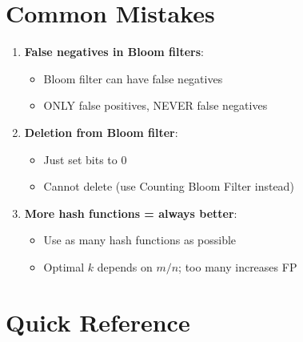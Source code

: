 \section{Common Mistakes}

\begin{warningbox}
\begin{enumerate}
    \item \textbf{False negatives in Bloom filters}:
    \begin{itemize}
        \item[$\times$] Bloom filter can have false negatives
        \item[\checkmark] ONLY false positives, NEVER false negatives
    \end{itemize}

    \item \textbf{Deletion from Bloom filter}:
    \begin{itemize}
        \item[$\times$] Just set bits to 0
        \item[\checkmark] Cannot delete (use Counting Bloom Filter instead)
    \end{itemize}

    \item \textbf{More hash functions = always better}:
    \begin{itemize}
        \item[$\times$] Use as many hash functions as possible
        \item[\checkmark] Optimal $k$ depends on $m/n$; too many increases FP
    \end{itemize}
\end{enumerate}
\end{warningbox}

\section{Quick Reference}


